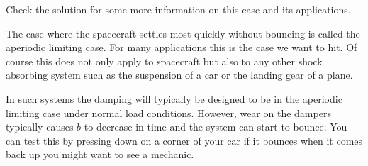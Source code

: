 \subquestion 
Check the solution for some more information on this case and its applications.

\solution 
The case where the spacecraft settles most quickly without bouncing is called the aperiodic limiting case. For many applications this is the case we want to hit. Of course this does not only apply to spacecraft but also to any other shock absorbing system such as the suspension of a car or the landing gear of a plane. 

In such systems the damping will typically be designed to be in the aperiodic limiting case under normal load conditions. However, wear on the dampers typically causes $b$ to decrease in time and the system can start to bounce. You can test this by pressing down on a corner of your car if it bounces when it comes back up you might want to see a mechanic. 

